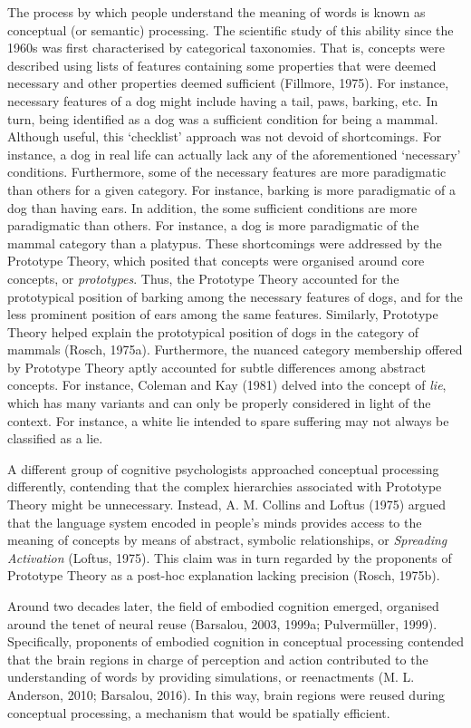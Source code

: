 \documentclass[
  12pt,
  man,floatsintext]{apa7}
\begin{document}
The process by which people understand the meaning of words is known as conceptual (or semantic) processing. The scientific study of this ability since the 1960s was first characterised by categorical taxonomies. That is, concepts were described using lists of features containing some properties that were deemed necessary and other properties deemed sufficient (Fillmore, 1975). For instance, necessary features of a dog might include having a tail, paws, barking, etc. In turn, being identified as a dog was a sufficient condition for being a mammal. Although useful, this `checklist' approach was not devoid of shortcomings. For instance, a dog in real life can actually lack any of the aforementioned `necessary' conditions. Furthermore, some of the necessary features are more paradigmatic than others for a given category. For instance, barking is more paradigmatic of a dog than having ears. In addition, the some sufficient conditions are more paradigmatic than others. For instance, a dog is more paradigmatic of the mammal category than a platypus. These shortcomings were addressed by the Prototype Theory, which posited that concepts were organised around core concepts, or \emph{prototypes}. Thus, the Prototype Theory accounted for the prototypical position of barking among the necessary features of dogs, and for the less prominent position of ears among the same features. Similarly, Prototype Theory helped explain the prototypical position of dogs in the category of mammals (Rosch, 1975a). Furthermore, the nuanced category membership offered by Prototype Theory aptly accounted for subtle differences among abstract concepts. For instance, Coleman and Kay (1981) delved into the concept of \emph{lie}, which has many variants and can only be properly considered in light of the context. For instance, a white lie intended to spare suffering may not always be classified as a lie.

A different group of cognitive psychologists approached conceptual processing differently, contending that the complex hierarchies associated with Prototype Theory might be unnecessary. Instead, A. M. Collins and Loftus (1975) argued that the language system encoded in people's minds provides access to the meaning of concepts by means of abstract, symbolic relationships, or \emph{Spreading Activation} (Loftus, 1975). This claim was in turn regarded by the proponents of Prototype Theory as a post-hoc explanation lacking precision (Rosch, 1975b).

Around two decades later, the field of embodied cognition emerged, organised around the tenet of neural reuse (Barsalou, 2003, 1999a; Pulvermüller, 1999). Specifically, proponents of embodied cognition in conceptual processing contended that the brain regions in charge of perception and action contributed to the understanding of words by providing simulations, or reenactments (M. L. Anderson, 2010; Barsalou, 2016). In this way, brain regions were reused during conceptual processing, a mechanism that would be spatially efficient.
\end{document}
